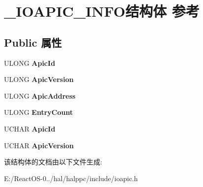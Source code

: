 \hypertarget{struct___i_o_a_p_i_c___i_n_f_o}{}\section{\+\_\+\+I\+O\+A\+P\+I\+C\+\_\+\+I\+N\+F\+O结构体 参考}
\label{struct___i_o_a_p_i_c___i_n_f_o}
\subsection*{Public 属性}
\begin{DoxyCompactItemize}
\item 
\mbox{\label{struct___i_o_a_p_i_c___i_n_f_o_ab8f08d8ba7ce05e1bf21a7346d812080}} 
U\+L\+O\+NG {\bfseries Apic\+Id}
\item 
\mbox{\label{struct___i_o_a_p_i_c___i_n_f_o_aea8137dda69ca3d028bbedcf3d8f7395}} 
U\+L\+O\+NG {\bfseries Apic\+Version}
\item 
\mbox{\label{struct___i_o_a_p_i_c___i_n_f_o_a129799822dd87be307da46573ae49875}} 
U\+L\+O\+NG {\bfseries Apic\+Address}
\item 
\mbox{\label{struct___i_o_a_p_i_c___i_n_f_o_ad94e168c6460d4d4946bb364225df95c}} 
U\+L\+O\+NG {\bfseries Entry\+Count}
\item 
\mbox{\label{struct___i_o_a_p_i_c___i_n_f_o_a1a5210dfb24ba45f9e4f637efc8ec136}} 
U\+C\+H\+AR {\bfseries Apic\+Id}
\item 
\mbox{\label{struct___i_o_a_p_i_c___i_n_f_o_a6d212fbcfeab2e59d1793105e93ceba2}} 
U\+C\+H\+AR {\bfseries Apic\+Version}
\end{DoxyCompactItemize}


该结构体的文档由以下文件生成\+:\begin{DoxyCompactItemize}
\item 
E\+:/\+React\+O\+S-\/0../hal/halppc/include/ioapic.\+h\end{DoxyCompactItemize}
